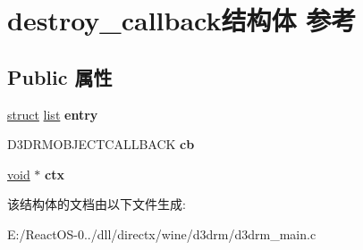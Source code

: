 \hypertarget{structdestroy__callback}{}\section{destroy\+\_\+callback结构体 参考}
\label{structdestroy__callback}
\subsection*{Public 属性}
\begin{DoxyCompactItemize}
\item 
\mbox{\label{structdestroy__callback_a4f7313448aab46bb4c59b61eea061424}} 
\hyperlink{interfacestruct}{struct} \hyperlink{classlist}{list} {\bfseries entry}
\item 
\mbox{\label{structdestroy__callback_a0afbf340d2cec7e2c1a747ef8b278990}} 
D3\+D\+R\+M\+O\+B\+J\+E\+C\+T\+C\+A\+L\+L\+B\+A\+CK {\bfseries cb}
\item 
\mbox{\label{structdestroy__callback_ae18b89a60ab69a341977d89188c5d8ca}} 
\hyperlink{interfacevoid}{void} $\ast$ {\bfseries ctx}
\end{DoxyCompactItemize}


该结构体的文档由以下文件生成\+:\begin{DoxyCompactItemize}
\item 
E\+:/\+React\+O\+S-\/0../dll/directx/wine/d3drm/d3drm\+\_\+main.\+c\end{DoxyCompactItemize}
